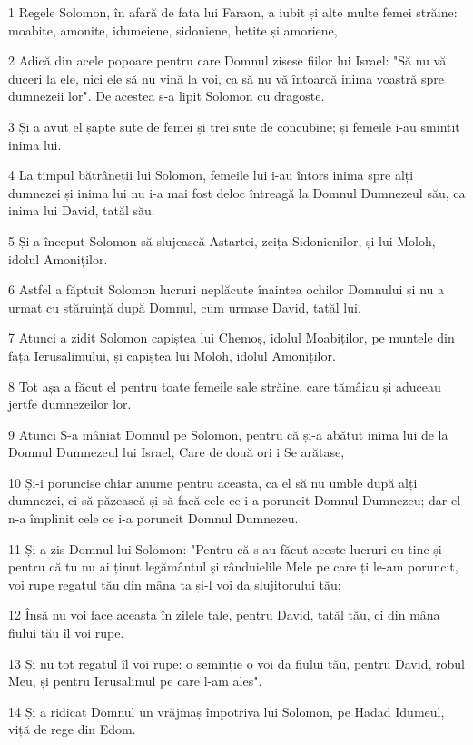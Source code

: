 \par 1 Regele Solomon, în afară de fata lui Faraon, a iubit și alte multe femei străine: moabite, amonite, idumeiene, sidoniene, hetite și amoriene,
\par 2 Adică din acele popoare pentru care Domnul zisese fiilor lui Israel: "Să nu vă duceri la ele, nici ele să nu vină la voi, ca să nu vă întoarcă inima voastră spre dumnezeii lor". De acestea s-a lipit Solomon cu dragoste.
\par 3 Și a avut el șapte sute de femei și trei sute de concubine; și femeile i-au smintit inima lui.
\par 4 La timpul bătrâneții lui Solomon, femeile lui i-au întors inima spre alți dumnezei și inima lui nu i-a mai fost deloc întreagă la Domnul Dumnezeul său, ca inima lui David, tatăl său.
\par 5 Și a început Solomon să slujească Astartei, zeița Sidonienilor, și lui Moloh, idolul Amoniților.
\par 6 Astfel a făptuit Solomon lucruri neplăcute înaintea ochilor Domnului și nu a urmat cu stăruință după Domnul, cum urmase David, tatăl lui.
\par 7 Atunci a zidit Solomon capiștea lui Chemoș, idolul Moabiților, pe muntele din fața Ierusalimului, și capiștea lui Moloh, idolul Amoniților.
\par 8 Tot așa a făcut el pentru toate femeile sale străine, care tămâiau și aduceau jertfe dumnezeilor lor.
\par 9 Atunci S-a mâniat Domnul pe Solomon, pentru că și-a abătut inima lui de la Domnul Dumnezeul lui Israel, Care de două ori i Se arătase,
\par 10 Și-i poruncise chiar anume pentru aceasta, ca el să nu umble după alți dumnezei, ci să păzească și să facă cele ce i-a poruncit Domnul Dumnezeu; dar el n-a împlinit cele ce i-a poruncit Domnul Dumnezeu.
\par 11 Și a zis Domnul lui Solomon: "Pentru că s-au făcut aceste lucruri cu tine și pentru că tu nu ai ținut legământul și rânduielile Mele pe care ți le-am poruncit, voi rupe regatul tău din mâna ta și-l voi da slujitorului tău;
\par 12 Însă nu voi face aceasta în zilele tale, pentru David, tatăl tău, ci din mâna fiului tău îl voi rupe.
\par 13 Și nu tot regatul îl voi rupe: o seminție o voi da fiului tău, pentru David, robul Meu, și pentru Ierusalimul pe care l-am ales".
\par 14 Și a ridicat Domnul un vrăjmaș împotriva lui Solomon, pe Hadad Idumeul, viță de rege din Edom.
